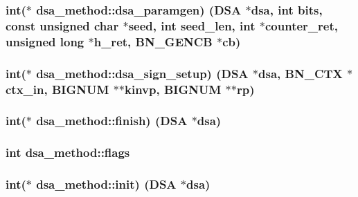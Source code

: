\subsubsection[{\texorpdfstring{dsa\+\_\+paramgen}{dsa_paramgen}}]{\setlength{\rightskip}{0pt plus 5cm}int($\ast$ dsa\+\_\+method\+::dsa\+\_\+paramgen) ({\bf D\+SA} $\ast$dsa, int {\bf bits}, const unsigned char $\ast$seed, int seed\+\_\+len, int $\ast$counter\+\_\+ret, unsigned long $\ast$h\+\_\+ret, {\bf B\+N\+\_\+\+G\+E\+N\+CB} $\ast${\bf cb})}\hypertarget{structdsa__method_a22d30cb3e62b00cbb818f7d2bacb99f7}{}\label{structdsa__method_a22d30cb3e62b00cbb818f7d2bacb99f7}
\subsubsection[{\texorpdfstring{dsa\+\_\+sign\+\_\+setup}{dsa_sign_setup}}]{\setlength{\rightskip}{0pt plus 5cm}int($\ast$ dsa\+\_\+method\+::dsa\+\_\+sign\+\_\+setup) ({\bf D\+SA} $\ast$dsa, {\bf B\+N\+\_\+\+C\+TX} $\ast$ctx\+\_\+in, {\bf B\+I\+G\+N\+UM} $\ast$$\ast$kinvp, {\bf B\+I\+G\+N\+UM} $\ast$$\ast$rp)}\hypertarget{structdsa__method_a6c731fb594e9d87b38351caf21b52f72}{}\label{structdsa__method_a6c731fb594e9d87b38351caf21b52f72}
\subsubsection[{\texorpdfstring{finish}{finish}}]{\setlength{\rightskip}{0pt plus 5cm}int($\ast$ dsa\+\_\+method\+::finish) ({\bf D\+SA} $\ast$dsa)}\hypertarget{structdsa__method_aad9fed78046fe8c6f995ba9ee8bd59d2}{}\label{structdsa__method_aad9fed78046fe8c6f995ba9ee8bd59d2}
\subsubsection[{\texorpdfstring{flags}{flags}}]{\setlength{\rightskip}{0pt plus 5cm}int dsa\+\_\+method\+::flags}\hypertarget{structdsa__method_ae5a10b0b8d5b139e5818da8da5223ebc}{}\label{structdsa__method_ae5a10b0b8d5b139e5818da8da5223ebc}
\subsubsection[{\texorpdfstring{init}{init}}]{\setlength{\rightskip}{0pt plus 5cm}int($\ast$ dsa\+\_\+method\+::init) ({\bf D\+SA} $\ast$dsa)}\hypertarget{structdsa__method_acfaf05310756308b9849f278cdfd91c6}{}\label{structdsa__method_acfaf05310756308b9849f278cdfd91c6}
